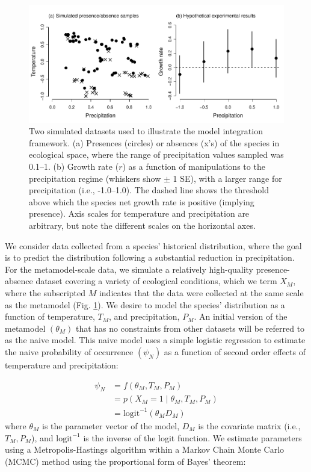 \documentclass[11pt]{article}
\newcommand{\rev}[1]{{\color{RoyalBlue}#1}}
\begin{document}
\begin{figure}[t]
	\includegraphics{figs/ex1_sampling.pdf}
	\caption{Two simulated datasets used to illustrate the model integration framework.
	(a) Presences (circles) or absences (x's) of the species in ecological space, \rev{where the range of precipitation values sampled was 0.1--1}.
	(b) Growth rate ($r$) as a function of manipulations to the precipitation regime (whiskers show $\pm$ 1 SE), with a larger range for precipitation (i.e., -1.0--1.0).
	The dashed line shows the threshold above which the species net growth rate is positive (implying presence).
	Axis scales for temperature and precipitation are arbitrary, but note the different scales on the horizontal axes.}
	\label{fig:ex1_sampling}
\end{figure}

We consider data collected from a species' historical distribution, where the goal is to predict the distribution following a substantial reduction in precipitation.
For the metamodel-scale data, we simulate a relatively high-quality presence-absence dataset covering a variety of ecological conditions, which we term \(X_M\), where the subscripted \(M\) indicates that the data were collected at the same scale as the metamodel (Fig. \ref{fig:ex1_sampling}).
We desire to model the species' distribution as a function of temperature, \(T_M\), and precipitation, \(P_M\).
An initial version of the metamodel \((\theta_M)\) that has no constraints from other datasets will be referred to as the naive model.
This naive model uses a simple logistic regression to estimate the naive probability of occurrence \((\psi_N)\) as a function of second order effects of temperature and precipitation:

\begin{equation}
\begin{aligned}
	\psi_N &= f\left(\theta_M, T_M, P_M \right) \\
	&= p \left (X_M = 1 \mid \theta_M, T_M, P_M \right) \\
	&=\text{logit}^{-1}\left( \theta_M D_M \right)
\end{aligned}
\end{equation}
where \(\theta_M\) is the parameter vector of the model, \(D_M\) is the covariate matrix (i.e., \(T_M, P_M\)), and \(\text{logit}^{-1}\) is the inverse of the logit function.
We estimate parameters using a Metropolis-Hastings algorithm within a Markov Chain Monte Carlo (MCMC) method using the proportional form of Bayes' theorem:
\end{document}
